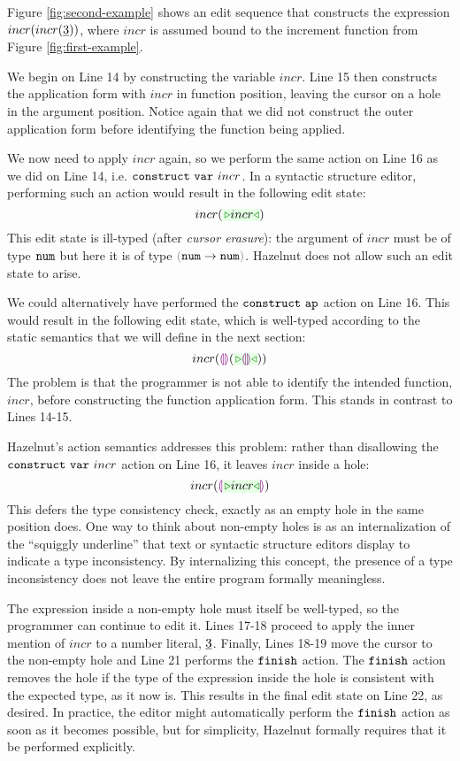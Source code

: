 Figure \ref{fig:second-example} shows an edit sequence that constructs the
expression $incr(incr(\underline{3}))$, where $incr$ is assumed bound to the
increment function from Figure \ref{fig:first-example}.

We begin on Line 14 by constructing the variable $incr$. Line 15 then
constructs the application form with $incr$ in function position, leaving
the cursor on a hole in the argument position. Notice again that we did not construct the outer application form before identifying the function
being applied. %

We now need to apply $incr$ again, so we perform the same action on Line 16
as we did on Line 14, i.e. $\mathtt{construct}~\mathtt{var}~incr$. In a syntactic
structure editor, performing such an action would result in the following
edit state:
\[
incr(\zwsel{incr})
\]
This edit state is ill-typed (after \emph{cursor erasure}): the argument of
$incr$ must be of type $\texttt{num}$ but here it is of type
$\tarr{\tnum}{\tnum}$. Hazelnut does not allow such an edit state to arise.

We could alternatively have performed the $\mathtt{construct}~\mathtt{ap}$
action on Line 16. This would result in the following edit state, which is
well-typed according to the static semantics that we will define in the
next section:
\[
incr(\hhole{}(\zwsel{\hhole{}}))
\]
The problem is that the programmer is not able to identify the intended
function, $incr$, before constructing the function application form. This stands in
contrast to Lines 14-15.

Hazelnut's action semantics addresses this problem: rather than disallowing
the $\mathtt{construct}~\mathtt{var}~incr$ action on Line 16, it leaves $incr$ inside a
hole:
\[
incr(\hhole{\zwsel{incr}})
\]
This defers the type consistency check, exactly as an empty hole in the
same position does. One way to think about non-empty holes is as an
internalization of the ``squiggly underline'' that text or syntactic
structure editors display to indicate a type inconsistency. By
internalizing this concept, the presence of a type inconsistency does not
leave the entire program formally meaningless.

The expression inside a non-empty hole must itself be well-typed, so the
programmer can continue to edit it. Lines 17-18 proceed to apply the inner
mention of $incr$ to a number literal, $\underline{3}$. Finally, Lines 18-19
move the cursor to the non-empty hole and Line 21 performs the $\mathtt{finish}$
action. The $\mathtt{finish}$ action removes the hole if the type of the
expression inside the hole is consistent with the expected type, as it now
is. This results in the final edit state on Line 22, as desired. In
practice, the editor might automatically perform the $\mathtt{finish}$ action as
soon as it becomes possible, but for simplicity, Hazelnut formally requires
that it be performed explicitly.

